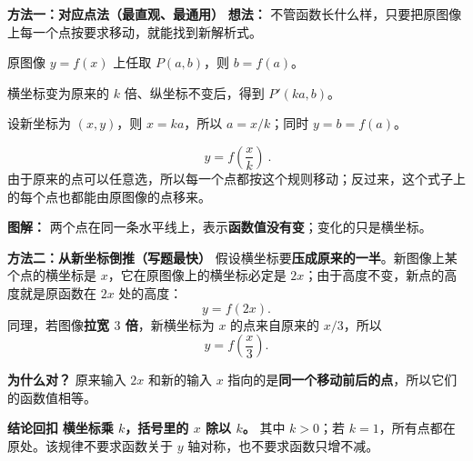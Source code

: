 \begin{proofbox}
  \textbf{\textcolor{CProof}{方法一：对应点法（最直观、最通用）}}
  \textbf{想法：} 不管函数长什么样，只要把原图像上每一个点按要求移动，就能找到新解析式。

  \begin{description}[style=nextline,leftmargin=2.8em,labelsep=0.5em,itemsep=0.4em]
    \item[\textbf{第1步：选一个原来的点。}]
      原图像 $y=f(x)$ 上任取 $P(a,b)$，则 $b=f(a)$。
    \item[\textbf{第2步：看这个点移到哪里。}]
      横坐标变为原来的 $k$ 倍、纵坐标不变后，得到 $P'(ka,b)$。
    \item[\textbf{第3步：用新的横坐标表示原来的。}]
      设新坐标为 $(x,y)$，则 $x=ka$，所以 $a=x/k$；同时 $y=b=f(a)$。
    \item[\textbf{第4步：写出新解析式。}]
      \[
        \boxed{\ y=f\!\left(\frac{x}{k}\right)\ }.
      \]
      由于原来的点可以任意选，所以每一个点都按这个规则移动；反过来，这个式子上的每个点也都能由原图像的点移来。
  \end{description}
  \begin{center}
  
  \end{center}
  \noindent\textbf{图解：} 两个点在同一条水平线上，表示\textbf{函数值没有变}；变化的只是横坐标。

  \medskip
  \textbf{\textcolor{CProof}{方法二：从新坐标倒推（写题最快）}}
  假设横坐标要\textbf{压成原来的一半}。新图像上某个点的横坐标是 $x$，它在原图像上的横坐标必定是 $2x$；由于高度不变，新点的高度就是原函数在 $2x$ 处的高度：
  \[
     y=f(2x).
  \]
  同理，若图像\textbf{拉宽 $3$ 倍}，新横坐标为 $x$ 的点来自原来的 $x/3$，所以
  \[
     y=f\!\left(\frac{x}{3}\right).
  \]
  \begin{center}
  
  \end{center}
  \noindent\textbf{为什么对？} 原来输入 $2x$ 和新的输入 $x$ 指向的是\textbf{同一个移动前后的点}，所以它们的函数值相等。

  \medskip
  \textbf{\textcolor{CProof}{结论回扣}}
  \textbf{横坐标乘 $k$，括号里的 $x$ 除以 $k$。} 其中 $k>0$；若 $k=1$，所有点都在原处。该规律不要求函数关于 $y$ 轴对称，也不要求函数只增不减。
\end{proofbox}
